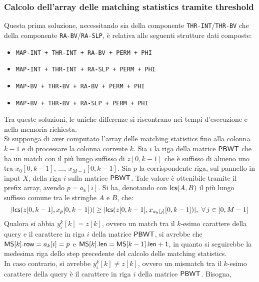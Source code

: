 \subsubsection{Calcolo dell'array delle matching statistics tramite threshold}
Questa prima soluzione, necessitando sia della componente
\texttt{THR-INT}/\texttt{THR-BV} che della componente
\texttt{RA-BV}/\texttt{RA-SLP}, è relativa alle seguenti strutture dati
composte: 
\begin{itemize}
  \item \texttt{MAP-INT + THR-INT + RA-BV + PERM + PHI}
  \item \texttt{MAP-INT + THR-INT + RA-SLP + PERM + PHI}
  \item \texttt{MAP-BV + THR-BV + RA-BV + PERM + PHI}
  \item \texttt{MAP-BV + THR-BV + RA-SLP + PERM + PHI}
\end{itemize}
Tra queste soluzioni, le uniche differenze si riscontrano nei tempi d'esecuzione
e nella memoria richiesta.\\
Si supponga di aver computato l'array delle matching statistics fino alla
colonna $k-1$ e di processare la colonna corrente $k$.
Sia $i$ la riga della matrice $\mbox{\rm {\sf PBWT}}$ che ha un match con il più lungo
suffisso di $z[0,k-1]$ che è suffisso di almeno uno tra $x_0[0,k-1]$, $\ldots$,
$x_{M-1}[0,k-1]$. Sia $p$ la corrispondente riga, sul pannello in input $X$,
della riga
$i$ sulla matrice $\mbox{\rm {\sf PBWT}}$. Tale valore è ottenibile tramite il prefix array,
avendo $p=a_k[i]$. Si ha, 
denotando con
$\mbox{\rm {\sf lcs}}(A,B)$ il più lungo suffisso comune tra le stringhe $A$ e $B$, che:
\begin{equation}
  \label{eq:thr1}
  |\mbox{\rm {\sf lcs}}(z[0,k-1], x_{p}[0,k-1])|\geq |\mbox{\rm {\sf lcs}}(z[0,k-1],
  x_{a_k[j]}[0,k-1])|,\,\,\forall\, 
  j\in[0,M-1] 
\end{equation}
Qualora si abbia $y_i^k[k]=z[k]$, ovvero un match tra il
$k$-esimo carattere della query e il carattere in riga $i$ della matrice
$\mbox{\rm {\sf PBWT}}$, si 
avrebbe che $\mbox{\rm {\sf MS}}[k].\mbox{\rm {\sf row}}=a_k[i]=p$ e $\mbox{\rm {\sf MS}}[k].\mbox{\rm {\sf len}} =
\mbox{\rm {\sf MS}}[k-1].\mbox{\rm {\sf len}}+1$, in 
quanto si seguirebbe la medesima riga dello step precedente del calcolo
delle matching statistics.\\
In caso contrario, si avrebbe 
$y_i^k[k]\neq z[k]$, ovvero un mismatch tra il $k$-esimo carattere
della query è il carattere in riga $i$ della matrice $\mbox{\rm {\sf PBWT}}$. Bisogna,
